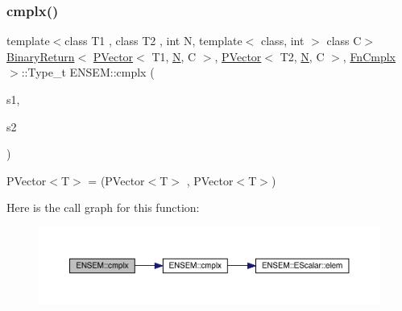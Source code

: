 \subsubsection{\texorpdfstring{cmplx()}{cmplx()}}
{\footnotesize\ttfamily template$<$class T1 , class T2 , int N, template$<$ class, int $>$ class C$>$ \\
\mbox{\hyperlink{structENSEM_1_1BinaryReturn}{Binary\+Return}}$<$ \mbox{\hyperlink{classENSEM_1_1PVector}{P\+Vector}}$<$ T1, \mbox{\hyperlink{operator__name__util_8cc_a7722c8ecbb62d99aee7ce68b1752f337}{N}}, C $>$, \mbox{\hyperlink{classENSEM_1_1PVector}{P\+Vector}}$<$ T2, \mbox{\hyperlink{operator__name__util_8cc_a7722c8ecbb62d99aee7ce68b1752f337}{N}}, C $>$, \mbox{\hyperlink{structENSEM_1_1FnCmplx}{Fn\+Cmplx}} $>$\+::Type\+\_\+t E\+N\+S\+E\+M\+::cmplx (\begin{DoxyParamCaption}\item[{const \mbox{\hyperlink{classENSEM_1_1PVector}{P\+Vector}}$<$ T1, \mbox{\hyperlink{operator__name__util_8cc_a7722c8ecbb62d99aee7ce68b1752f337}{N}}, C $>$ \&}]{s1,  }\item[{const \mbox{\hyperlink{classENSEM_1_1PVector}{P\+Vector}}$<$ T2, \mbox{\hyperlink{operator__name__util_8cc_a7722c8ecbb62d99aee7ce68b1752f337}{N}}, C $>$ \&}]{s2 }\end{DoxyParamCaption})\hspace{0.3cm}{\ttfamily [inline]}}



P\+Vector$<$\+T$>$ = (P\+Vector$<$\+T$>$ , P\+Vector$<$\+T$>$) 

Here is the call graph for this function\+:\nopagebreak
\begin{figure}[H]
\begin{center}
\leavevmode
\includegraphics[width=350pt]{d3/dc4/group__primvector_ga4b7fc81e0d4329f6c328adee1c9daf7e_cgraph}
\end{center}
\end{figure}
\mbox{\label{group__primvector_gaf0e85ba33a2d6040ed1d0e3869ae7818}} 
